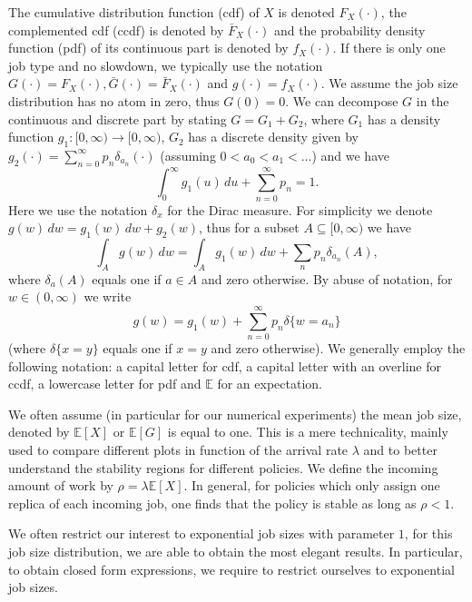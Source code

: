 \documentclass[12pt]{report}
\newcommand{\E}{\mathbb{E}}
\begin{document}
The cumulative distribution function (cdf) of $X$ is denoted $F_X(\cdot)$, the complemented cdf (ccdf) is denoted by $\bar F_X(\cdot)$ and the probability density function (pdf) of its continuous part is denoted by $f_X(\cdot)$. If there is only one job type and no slowdown, we typically use the notation $G(\cdot) = F_X(\cdot), \bar{G}(\cdot) = \bar F_X(\cdot)$ and $g(\cdot) = f_X(\cdot)$. We assume the job size distribution has no atom in zero, thus $G(0) = 0$. We can decompose $G$ in the continuous and discrete part by stating $G = G_1 + G_2$, where $G_1$ has a density function $g_1:[0,\infty) \rightarrow [0,\infty)$, $G_2$ has a discrete density given by $g_2(\cdot) = \sum_{n=0}^\infty p_n \delta_{a_n}(\cdot)$ (assuming $0 < a_0 < a_1 < \dots$) and we have 
$$\int_0^\infty g_1(u)\, du + \sum_{n=0}^\infty p_n =1.$$
Here we use the notation $\delta_x$ for the Dirac measure. For simplicity we denote $g(w)\,dw = g_1(w)\,dw + g_2(w)$, thus for a subset $A\subseteq [0,\infty)$ we have 
$$
\int_A g(w) \, dw = \int_A g_1(w)\, dw + \sum_n p_n \delta_{a_n}(A),
$$
where $\delta_a(A)$ equals one if $a \in A$ and zero otherwise. By abuse of notation, for $w \in (0,\infty)$ we write 
$$
g(w) = g_1(w) + \sum_{n=0}^\infty p_n \delta\{w=a_n\}
$$
(where $\delta\{x=y\}$ equals one if $x=y$ and zero otherwise). We generally employ the following notation: a capital letter for cdf, a capital letter with an overline for ccdf, a lowercase letter for pdf and $\E$ for an expectation.

We often assume (in particular for our numerical experiments) the mean job size, denoted by $\E[X]$ or $\E[G]$ is equal to one. This is a mere technicality, mainly used to compare different plots in function of the arrival rate $\lambda$ and to better understand the stability regions for different policies. We define the incoming amount of work by $\rho=\lambda \E[X]$. In general, for policies which only assign one replica of each incoming job, one finds that the policy is stable as long as $\rho < 1$.


We often restrict our interest to exponential job sizes with parameter $1$, for this job size distribution, we are able to obtain the most elegant results. In particular, to obtain closed form expressions, we require to restrict ourselves to exponential job sizes.
\end{document}
